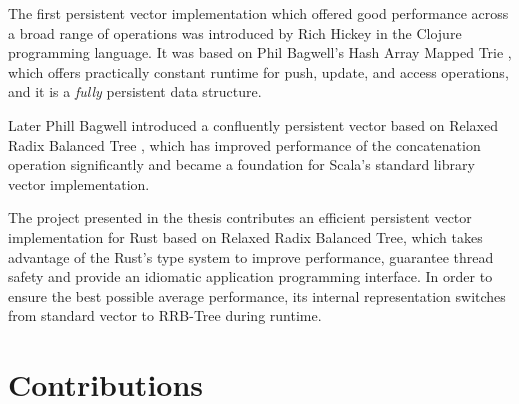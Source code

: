 The first persistent vector implementation which offered good performance across a broad range of operations was introduced by Rich Hickey in the Clojure programming language. It was based on Phil Bagwell's Hash Array Mapped Trie \cite{ideal-hash-trees}, which offers practically constant runtime for push, update, and access operations, and it is a \emph{fully} persistent data structure. 

Later Phill Bagwell introduced a confluently persistent vector based on Relaxed Radix Balanced Tree \cite{efficient-immutable-vectors}, which has improved performance of the concatenation operation significantly and became a foundation for Scala's standard library vector implementation. 

The project presented in the thesis contributes an efficient persistent vector implementation for Rust based on Relaxed Radix Balanced Tree, which takes advantage of the Rust's type system to improve performance, guarantee thread safety and provide an idiomatic application programming interface. In order to ensure the best possible average performance, its internal representation switches from standard vector to RRB-Tree during runtime. 

\section{Contributions}
\label{sec:contributions}

